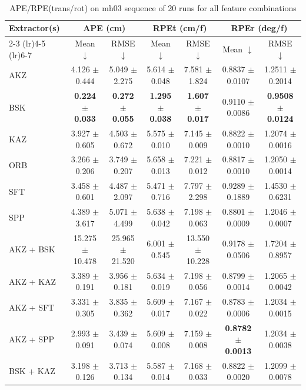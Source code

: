 \begin{table}[hbp]
\centering
\caption{APE/RPE(trans/rot) on mh03 sequence of 20 runs for all feature combinations}
\scriptsize
\label{tab:mh03_ape_rpe}\
\setlength{\tabcolsep}{3pt}
\begin{tabular}{lcccccc}
\toprule
\textbf{Extractor(s)}
& \multicolumn{2}{c}{\textbf{APE (cm)}}
& \multicolumn{2}{c}{\textbf{RPEt (cm/f)}}
& \multicolumn{2}{c}{\textbf{RPEr (deg/f)}} \\
\cmidrule(lr){2-3} \cmidrule(lr){4-5} \cmidrule(lr){6-7}
& Mean $\downarrow$ & RMSE $\downarrow$
& Mean $\downarrow$ & RMSE $\downarrow$
& Mean $\downarrow$ & RMSE $\downarrow$ \\
\midrule
AKZ & 4.126 $\pm$ 0.444 & 5.049 $\pm$ 2.275 & 5.614 $\pm$ 0.048 & 7.581 $\pm$ 1.824 & 0.8837 $\pm$ 0.0107 & 1.2511 $\pm$ 0.2014 \\
BSK & \textbf{0.224 $\pm$ 0.033} & \textbf{0.272 $\pm$ 0.055} & \textbf{1.295 $\pm$ 0.038} & \textbf{1.607 $\pm$ 0.017} & 0.9110 $\pm$ 0.0086 & \textbf{0.9508 $\pm$ 0.0124} \\
KAZ & 3.927 $\pm$ 0.605 & 4.503 $\pm$ 0.672 & 5.575 $\pm$ 0.010 & 7.145 $\pm$ 0.009 & 0.8822 $\pm$ 0.0010 & 1.2074 $\pm$ 0.0016 \\
ORB & 3.266 $\pm$ 0.206 & 3.749 $\pm$ 0.207 & 5.658 $\pm$ 0.013 & 7.221 $\pm$ 0.012 & 0.8817 $\pm$ 0.0010 & 1.2050 $\pm$ 0.0014 \\
SFT & 3.458 $\pm$ 0.601 & 4.487 $\pm$ 2.097 & 5.471 $\pm$ 0.716 & 7.797 $\pm$ 2.298 & 0.9289 $\pm$ 0.1889 & 1.4530 $\pm$ 0.6231 \\
SPP & 4.389 $\pm$ 3.617 & 5.071 $\pm$ 4.499 & 5.638 $\pm$ 0.042 & 7.198 $\pm$ 0.063 & 0.8801 $\pm$ 0.0009 & 1.2046 $\pm$ 0.0007 \\
AKZ + BSK & 15.275 $\pm$ 10.478 & 25.965 $\pm$ 21.520 & 6.001 $\pm$ 0.545 & 13.550 $\pm$ 10.228 & 0.9178 $\pm$ 0.0506 & 1.7204 $\pm$ 0.8957 \\
AKZ + KAZ & 3.389 $\pm$ 0.191 & 3.956 $\pm$ 0.181 & 5.634 $\pm$ 0.019 & 7.198 $\pm$ 0.056 & 0.8799 $\pm$ 0.0014 & 1.2065 $\pm$ 0.0042 \\
AKZ + SFT & 3.331 $\pm$ 0.305 & 3.835 $\pm$ 0.362 & 5.609 $\pm$ 0.017 & 7.167 $\pm$ 0.022 & 0.8783 $\pm$ 0.0006 & 1.2034 $\pm$ 0.0015 \\
AKZ + SPP & 2.993 $\pm$ 0.091 & 3.439 $\pm$ 0.074 & 5.609 $\pm$ 0.008 & 7.159 $\pm$ 0.008 & \textbf{0.8782 $\pm$ 0.0013} & 1.2034 $\pm$ 0.0038 \\
BSK + KAZ & 3.198 $\pm$ 0.126 & 3.713 $\pm$ 0.134 & 5.587 $\pm$ 0.014 & 7.168 $\pm$ 0.033 & 0.8822 $\pm$ 0.0020 & 1.2099 $\pm$ 0.0078 \\

\end{tabular}
\end{table}
